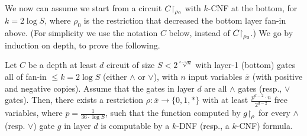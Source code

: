 We now can assume we start from a circuit $C{\upharpoonright}_{\rho_0}$ with $k$-CNF at the bottom, for $k = 2 \log S$, where $\rho_0$ is the restriction that decreased the bottom layer fan-in above. (For simplicity we use the notation $C$ below, instead of $C{\upharpoonright}_{\rho_0}$.)
We go by induction on depth, to prove the following.


\begin{tcolorbox}[colframe=white, colback=red!11, boxrule=0mm, sharp corners]
\begin{lemma}\label{lem:induction-switch}
Let $C$ be a depth at least $d$ circuit of size 
$S<
2^{
\sqrt[d-1]{n}
}$ 
with layer-1 (bottom) gates all of fan-in  $ \leq k=2 \log S$ (either  $\land$ or $\lor$),
with $n$ input variables  
$\overline x$ (with positive and negative copies). Assume that the gates in layer $d$ are all $\land$ gates (resp., $\lor$ gates). 
Then, there exists a restriction $\rho: \overline {x} \rightarrow\{0,1, *\} $ with at least  $\frac{p^{d-2} \cdot n}{2^{d-2}} $ free variables, where $ p=\frac{1}{36 \cdot \log S}$, such that  
the function computed by $g{\upharpoonright}_{\rho}$ for every $\land$ (resp. $\lor$) gate $g$ in layer $d$ is computable by a $k$-DNF (resp., a $k$-CNF) formula. 
\end{lemma} 
\end{tcolorbox}

